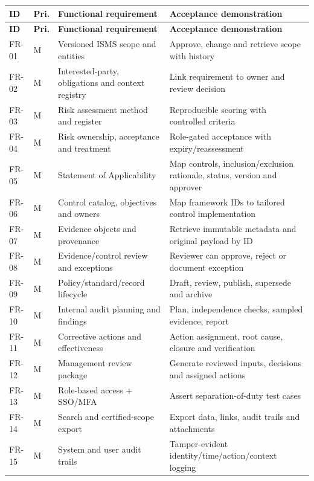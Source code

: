 \documentclass[10pt,letterpaper]{article}
\begin{document}
\small

\begin{longtable}{@{}L{0.58in}L{0.36in}L{2.55in}L{2.87in}@{}}
\toprule
\textbf{ID} & \textbf{Pri.} & \textbf{Functional requirement} & \textbf{Acceptance demonstration}\\\midrule\endfirsthead
\toprule\textbf{ID} & \textbf{Pri.} & \textbf{Functional requirement} & \textbf{Acceptance demonstration}\\\midrule\endhead
FR-01 & M & Versioned ISMS scope and entities & Approve, change and retrieve scope with history\\
FR-02 & M & Interested-party, obligations and context registry & Link requirement to owner and review decision\\
FR-03 & M & Risk assessment method and register & Reproducible scoring with controlled criteria\\
FR-04 & M & Risk ownership, acceptance and treatment & Role-gated acceptance with expiry/reassessment\\
FR-05 & M & Statement of Applicability & Map controls, inclusion/exclusion rationale, status, version and approver\\
FR-06 & M & Control catalog, objectives and owners & Map framework IDs to tailored control implementation\\
FR-07 & M & Evidence objects and provenance & Retrieve immutable metadata and original payload by ID\\
FR-08 & M & Evidence/control review and exceptions & Reviewer can approve, reject or document exception\\
FR-09 & M & Policy/standard/record lifecycle & Draft, review, publish, supersede and archive\\
FR-10 & M & Internal audit planning and findings & Plan, independence checks, sampled evidence, report\\
FR-11 & M & Corrective actions and effectiveness & Action assignment, root cause, closure and verification\\
FR-12 & M & Management review package & Generate reviewed inputs, decisions and assigned actions\\
FR-13 & M & Role-based access + SSO/MFA & Assert separation-of-duty test cases\\
FR-14 & M & Search and certified-scope export & Export data, links, audit trails and attachments\\
FR-15 & M & System and user audit trails & Tamper-evident identity/time/action/context logging\\

\end{longtable}
\end{document}
